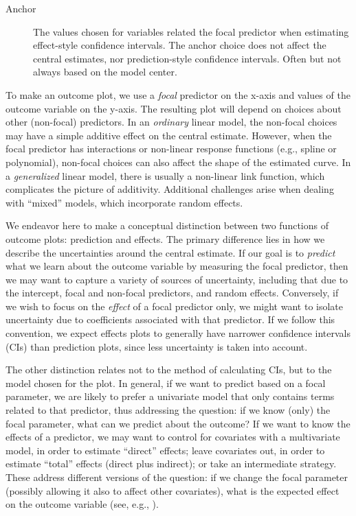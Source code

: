 \begin{gloss}
\begin{description}
\item [Anchor] The values chosen for variables related the focal predictor when estimating effect-style confidence intervals. The anchor choice does not affect the central estimates, nor prediction-style confidence intervals. Often but not always based on the model center. 

\end{description}
\end{gloss}

To make an outcome plot, we use a \emph{focal} predictor on the x-axis and values of the outcome variable on the y-axis. The resulting plot will depend on choices about other (non-focal) predictors. In an \emph{ordinary} linear model, the non-focal choices may have a simple additive effect on the central estimate. However, when the focal predictor has interactions or non-linear response functions (e.g., spline or polynomial), non-focal choices can also affect the shape of the estimated curve. 
In a \emph{generalized} linear model, there is usually a non-linear link function, which complicates the picture of additivity.
Additional challenges arise when dealing with “mixed” models, which incorporate random effects.

We endeavor here to make a conceptual distinction between two functions of 
outcome plots: prediction and effects. 
The primary difference lies in how we describe the uncertainties around the central estimate. 
If our goal is to \emph{predict} what we learn about the outcome variable by measuring the focal predictor, then we may want to capture a variety of sources of uncertainty, including that due to the intercept, focal and non-focal predictors, and random effects.
Conversely, if we wish to focus on the \emph{effect} of a focal predictor only, we might want to isolate uncertainty due to coefficients associated with that predictor.
If we follow this convention, we expect effects plots to generally have narrower confidence intervals (CIs) than prediction plots, since less uncertainty is taken into account.

The other distinction relates not to the method of calculating CIs, but to the model chosen for the plot. 
In general, if we want to predict based on a focal parameter, we are likely to prefer a univariate model that only contains terms related to that predictor, thus addressing the question: if we know (only) the focal parameter, what can we predict about the outcome?
If we want to know the effects of a predictor, we may want to control for covariates with a multivariate model, in order to estimate “direct” effects; leave covariates out, in order to estimate “total” effects (direct plus indirect); or take an intermediate strategy.
These address different versions of the question: if we change the focal parameter (possibly allowing it also to affect other covariates), what is the expected effect on the outcome variable (see, e.g., \citep{shi_evidence_2017}).

